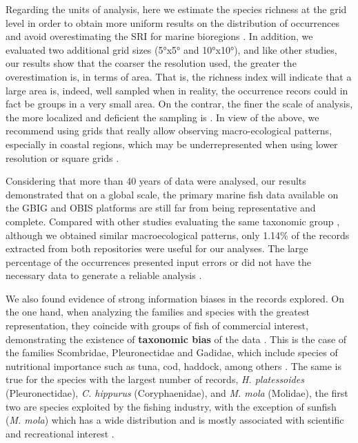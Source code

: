 \documentclass[12pt,authoryear]{elsarticle}
\begin{document}
Regarding the units of analysis, here we estimate the species richness at the grid level in order to obtain more uniform results on the distribution of occurrences and avoid overestimating the SRI for marine bioregions \citep{pelayo2018}. In addition, we evaluated two additional grid sizes (5°x5° and 10°x10°), and like other studies,
%
our results show that the coarser the resolution used, the greater the overestimation is, in terms of area. That is, the richness index will indicate that a large area is, indeed, well sampled when in reality, the occurrence recors could in fact be groups in a very small area. On the contrar, the finer the scale of analysis, the more localized and deficient the sampling is
%
\citep{tittensor2010global,garcia2015,meyer2015,troia2016,troia2017}. In view of the above, we recommend using grids that really allow observing macro-ecological patterns, especially in coastal regions, which may be underrepresented when using lower resolution or square grids \citep{pelayo2018}.

Considering that more than 40 years of data were analysed, our results demonstrated that on a global scale, the primary marine fish data available on the GBIG and OBIS platforms are still far from being representative and complete. Compared with other studies evaluating the same taxonomic group \citep{mora2008completeness,garcia2015}, although we obtained similar macroecological patterns, only 1.14\% of the records extracted from both repositories were useful for our analyses. The large percentage of the occurrences presented input errors or did not have the necessary data to generate a reliable analysis \citep{yesson2007,garcia2014}.

We also found evidence of strong information biases in the records explored. On the one hand, when analyzing the families and species with the greatest representation, they coincide with groups of fish of commercial interest, demonstrating the existence of \textbf{taxonomic bias }of the data \citep{melo2020}. This is the case of the families Scombridae, Pleuronectidae and Gadidae, which include species of nutritional importance such as tuna, cod, haddock, among others \citep{cohen1990}. The same is true for the species with the largest number of records, \textit{H. platessoides} (Pleuronectidae), \textit{C. hippurus }(Coryphaenidae), and \textit{M. mola} (Molidae), the first two are species exploited by the fishing industry, with the exception of sunfish (\textit{M. mola}) which has a wide distribution and is mostly associated with scientific and recreational interest \citep{pope2010}.
\end{document}
